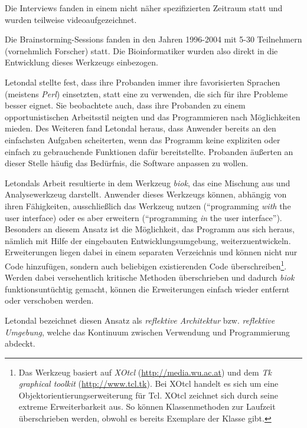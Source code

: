 Die Interviews fanden in einem nicht näher spezifizierten Zeitraum statt und wurden teilweise videoaufgezeichnet.

Die Brainstorming-Sessions fanden in den Jahren 1996-2004 mit 5-30 Teilnehmern (vornehmlich Forscher) statt. Die Bioinformatiker wurden also direkt in die Entwicklung dieses Werkzeugs einbezogen.

Letondal stellte fest, dass ihre Probanden immer ihre favorisierten Sprachen (meistens \textit{Perl}) einsetzten, statt eine zu verwenden, die sich für ihre Probleme besser eignet. Sie beobachtete auch, dass ihre Probanden zu einem opportunistischen Arbeitsstil \citep[vgl. ][]{clarke:DSP:2007:1080,Ko:2011el} neigten und das Programmieren nach Möglichkeiten mieden. Des Weiteren fand Letondal heraus, dass Anwender bereits an den einfachsten Aufgaben scheiterten, wenn das Programm keine expliziten oder einfach zu gebrauchende Funktionen dafür bereitstellte. Probanden äußerten an dieser Stelle häufig das Bedürfnis, die Software anpassen zu wollen.

Letondals Arbeit resultierte in dem Werkzeug \textit{biok}, das eine Mischung aus  und Analysewerkzeug darstellt. Anwender dieses Werkzeugs können, abhängig von ihren Fähigkeiten, ausschließlich das Werkzeug nutzen (``programming \textit{with} the user interface) oder es aber erweitern (``programming \textit{in} the user interface''). Besonders an diesem Ansatz ist die Möglichkeit, das Programm aus sich heraus, nämlich mit Hilfe der eingebauten Entwicklungsumgebung, weiterzuentwickeln. Erweiterungen liegen dabei in einem separaten Verzeichnis und können nicht nur Code hinzufügen, sondern auch beliebigen existierenden Code überschreiben\footnote{Das Werkzeug basiert auf \textit{XOtcl} (\url{http://media.wu.ac.at}) und dem \textit{Tk graphical toolkit} (\url{http://www.tcl.tk}). Bei XOtcl handelt es sich um eine Objektorientierungserweiterung für Tcl. XOtcl zeichnet sich durch seine extreme Erweiterbarkeit aus. So können Klassenmethoden zur Laufzeit überschrieben werden, obwohl es bereits Exemplare der Klasse gibt.}. Werden dabei versehentlich kritische Methoden überschrieben und dadurch \textit{biok} funktionsuntüchtig gemacht, können die Erweiterungen einfach wieder entfernt oder verschoben werden.

Letondal bezeichnet diesen Ansatz als \textit{reflektive Architektur} bzw. \textit{reflektive Umgebung}, welche das Kontinuum zwischen Verwendung und Programmierung abdeckt.

